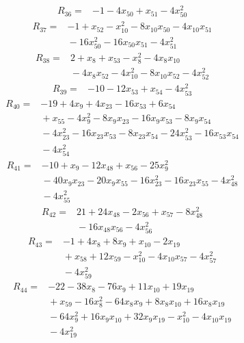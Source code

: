 \documentclass[11pt]{article}
\theoremstyle{definition}
\theoremstyle{remark}
\begin{document}
\begin{align*}
R_{36} ={}& -1 - 4x_{50} + x_{51} - 4x_{50}^{2}
\end{align*}
\begin{align*}
R_{37} ={}& -1 + x_{52} - x_{10}^{2} - 8x_{10} x_{50} - 4x_{10} x_{51} \\
&{} -16x_{50}^{2} - 16x_{50} x_{51} - 4x_{51}^{2}
\end{align*}
\begin{align*}
R_{38} ={}& 2 + x_{8} + x_{53} - x_{8}^{2} - 4x_{8} x_{10} \\
&{} -4x_{8} x_{52} - 4x_{10}^{2} - 8x_{10} x_{52} - 4x_{52}^{2}
\end{align*}
\begin{align*}
R_{39} ={}& -10 - 12x_{53} + x_{54} - 4x_{53}^{2}
\end{align*}
\begin{align*}
R_{40} ={}& -19 + 4x_{9} + 4x_{23} - 16x_{53} + 6x_{54} \\
&{} + x_{55} - 4x_{9}^{2} - 8x_{9} x_{23} - 16x_{9} x_{53} - 8x_{9} x_{54} \\
&{} -4x_{23}^{2} - 16x_{23} x_{53} - 8x_{23} x_{54} - 24x_{53}^{2} - 16x_{53} x_{54} \\
&{} -4x_{54}^{2}
\end{align*}
\begin{align*}
R_{41} ={}& -10 + x_{9} - 12x_{48} + x_{56} - 25x_{9}^{2} \\
&{} -40x_{9} x_{23} - 20x_{9} x_{55} - 16x_{23}^{2} - 16x_{23} x_{55} - 4x_{48}^{2} \\
&{} -4x_{55}^{2}
\end{align*}
\begin{align*}
R_{42} ={}& 21 + 24x_{48} - 2x_{56} + x_{57} - 8x_{48}^{2} \\
&{} -16x_{48} x_{56} - 4x_{56}^{2}
\end{align*}
\begin{align*}
R_{43} ={}& -1 + 4x_{8} + 8x_{9} + x_{10} - 2x_{19} \\
&{} + x_{58} + 12x_{59} - x_{10}^{2} - 4x_{10} x_{57} - 4x_{57}^{2} \\
&{} -4x_{59}^{2}
\end{align*}
\begin{align*}
R_{44} ={}& -22 - 38x_{8} - 76x_{9} + 11x_{10} + 19x_{19} \\
&{} + x_{59} - 16x_{8}^{2} - 64x_{8} x_{9} + 8x_{8} x_{10} + 16x_{8} x_{19} \\
&{} -64x_{9}^{2} + 16x_{9} x_{10} + 32x_{9} x_{19} - x_{10}^{2} - 4x_{10} x_{19} \\
&{} -4x_{19}^{2}
\end{align*}
\end{document}
